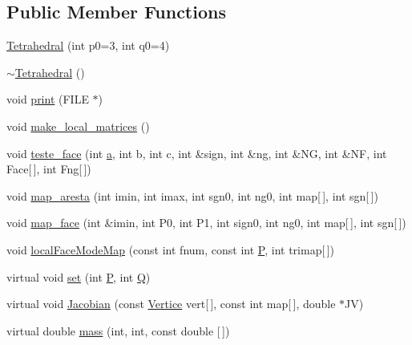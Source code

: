 \subsection*{Public Member Functions}
\begin{DoxyCompactItemize}
\item 
\hyperlink{classTetrahedral_a3e935a037be9958f92e17deda1a721a8}{Tetrahedral} (int p0=3, int q0=4)
\item 
\hyperlink{classTetrahedral_a81029f61fca381d618bf9ec26cffdf51}{$\sim$\+Tetrahedral} ()
\item 
void \hyperlink{classTetrahedral_acd3b75bf44c11339f2d7601385707cb6}{print} (F\+I\+LE $\ast$)
\item 
void \hyperlink{classTetrahedral_a15c9a6bcfaddf95eb77e8c56d4a62125}{make\+\_\+local\+\_\+matrices} ()
\item 
void \hyperlink{classTetrahedral_a490b36fd79d587ca945795fb53b6142b}{teste\+\_\+face} (int \hyperlink{DG__EI__Header_8h_a491bc358fce276972681cc0be8844bd7}{a}, int b, int c, int \&sign, int \&ng, int \&NG, int \&NF, int Face\mbox{[}$\,$\mbox{]}, int Fng\mbox{[}$\,$\mbox{]})
\item 
void \hyperlink{classTetrahedral_ae062b912f6356640d54700035b3ec75e}{map\+\_\+aresta} (int imin, int imax, int sgn0, int ng0, int map\mbox{[}$\,$\mbox{]}, int sgn\mbox{[}$\,$\mbox{]})
\item 
void \hyperlink{classTetrahedral_a3db10cbcaa2306d1be9656c04c9e9366}{map\+\_\+face} (int \&imin, int P0, int P1, int sign0, int ng0, int map\mbox{[}$\,$\mbox{]}, int sgn\mbox{[}$\,$\mbox{]})
\item 
void \hyperlink{classTetrahedral_a5989cedeb4b852e77658ba761ac32519}{local\+Face\+Mode\+Map} (const int fnum, const int \hyperlink{classStdel_a05cbb3f2a3fa0bc04a74e347dc6574cf}{P}, int trimap\mbox{[}$\,$\mbox{]})
\item 
virtual void \hyperlink{classTetrahedral_a05fc469d2a88e8a08a0a64621883d021}{set} (int \hyperlink{classStdel_a05cbb3f2a3fa0bc04a74e347dc6574cf}{P}, int \hyperlink{classStdel_a82074e598ad5af5ec45a3257a3c2b684}{Q})
\item 
virtual void \hyperlink{classTetrahedral_abe0c60a6df85f832c81876468fe39c2e}{Jacobian} (const \hyperlink{structVertice}{Vertice} vert\mbox{[}$\,$\mbox{]}, const int map\mbox{[}$\,$\mbox{]}, double $\ast$JV)
\item 
virtual double \hyperlink{classTetrahedral_a0ac27c7dabcc007ef5a2acaa3cfe789d}{mass} (int, int, const double \mbox{[}$\,$\mbox{]})
\item 

\end{DoxyCompactItemize}
